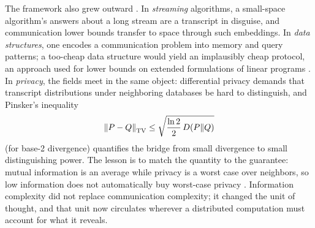 The framework also grew outward \cite{braverman15}. In \emph{streaming} algorithms, a small-space algorithm's answers about a long stream are a transcript in disguise, and communication lower bounds transfer to space through such embeddings. In \emph{data structures}, one encodes a communication problem into memory and query patterns; a too-cheap data structure would yield an implausibly cheap protocol, an approach used for lower bounds on extended formulations of linear programs \cite{braverman11}. In \emph{privacy}, the fields meet in the same object: differential privacy demands that transcript distributions under neighboring databases be hard to distinguish, and Pinsker's inequality
\[
\left\lVert P-Q\right\rVert_{\mathrm{TV}}\le\sqrt{\frac{\ln 2}{2}\,D(P\Vert Q)}
\]
(for base-2 divergence) quantifies the bridge from small divergence to small distinguishing power. The lesson is to match the quantity to the guarantee: mutual information is an average while privacy is a worst case over neighbors, so low information does not automatically buy worst-case privacy \cite{braverman14}. Information complexity did not replace communication complexity; it changed the unit of thought, and that unit now circulates wherever a distributed computation must account for what it reveals.

